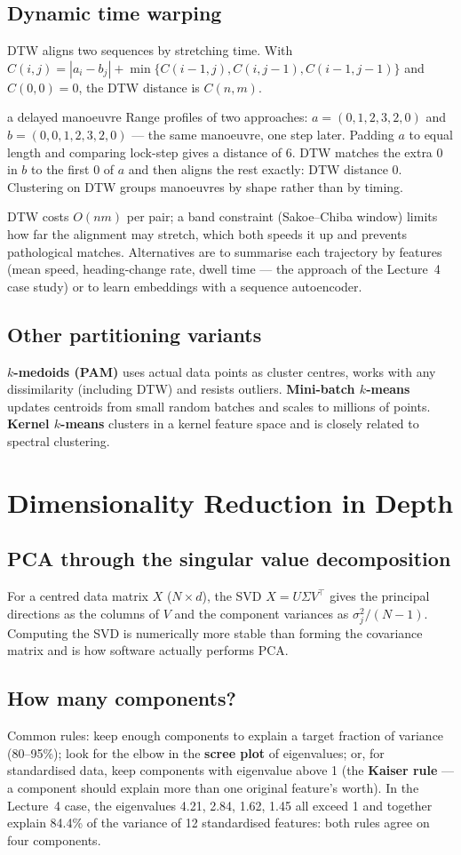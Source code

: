 \documentclass[11pt]{article}
\begin{document}
\subsection{Dynamic time warping}
DTW aligns two sequences by stretching time. With $C(i,j)=|a_i-b_j|+\min\{C(i-1,j),C(i,j-1),C(i-1,j-1)\}$ and $C(0,0)=0$, the DTW distance is $C(n,m)$.
\begin{example}{a delayed manoeuvre}
Range profiles of two approaches: $a=(0,1,2,3,2,0)$ and $b=(0,0,1,2,3,2,0)$ --- the same manoeuvre, one step later. Padding $a$ to equal length and comparing lock-step gives a distance of 6. DTW matches the extra 0 in $b$ to the first 0 of $a$ and then aligns the rest exactly: DTW distance 0. Clustering on DTW groups manoeuvres by shape rather than by timing.
\end{example}
DTW costs $O(nm)$ per pair; a band constraint (Sakoe--Chiba window) limits how far the alignment may stretch, which both speeds it up and prevents pathological matches. Alternatives are to summarise each trajectory by features (mean speed, heading-change rate, dwell time --- the approach of the Lecture~4 case study) or to learn embeddings with a sequence autoencoder.
\subsection{Other partitioning variants}
\textbf{$k$-medoids (PAM)} uses actual data points as cluster centres, works with any dissimilarity (including DTW) and resists outliers. \textbf{Mini-batch $k$-means} updates centroids from small random batches and scales to millions of points. \textbf{Kernel $k$-means} clusters in a kernel feature space and is closely related to spectral clustering.

\section{Dimensionality Reduction in Depth}
\subsection{PCA through the singular value decomposition}
For a centred data matrix $X$ ($N\times d$), the SVD $X=U\Sigma V^\top$ gives the principal directions as the columns of $V$ and the component variances as $\sigma_j^2/(N-1)$. Computing the SVD is numerically more stable than forming the covariance matrix and is how software actually performs PCA.
\subsection{How many components?}
Common rules: keep enough components to explain a target fraction of variance (80--95\%); look for the elbow in the \textbf{scree plot} of eigenvalues; or, for standardised data, keep components with eigenvalue above 1 (the \textbf{Kaiser rule} --- a component should explain more than one original feature's worth). In the Lecture~4 case, the eigenvalues 4.21, 2.84, 1.62, 1.45 all exceed 1 and together explain 84.4\% of the variance of 12 standardised features: both rules agree on four components.
\end{document}
